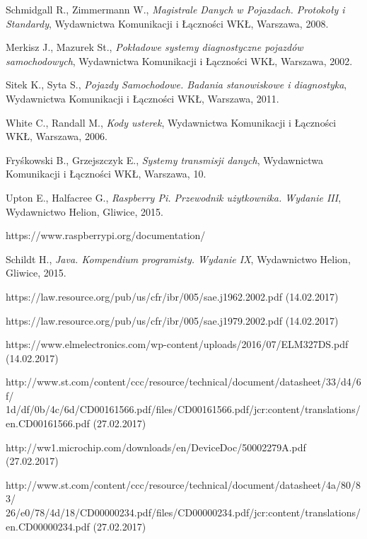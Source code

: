 \documentclass[12pt]{article} %
\numberwithin{equation}{subsection}
\numberwithin{figure}{section}
\numberwithin{table}{section}
\begin{document}
\begin{thebibliography}{99}

		Schmidgall R., Zimmermann W., \emph{Magistrale Danych w Pojazdach. Protokoły i Standardy}, Wydawnictwa Komunikacji i Łączności WKŁ, Warszawa, 2008.

		Merkisz J., Mazurek St., \emph{Pokładowe systemy diagnostyczne pojazdów samochodowych}, Wydawnictwa Komunikacji i Łączności WKŁ, Warszawa, 2002.		
		
		Sitek K., Syta S., \emph{Pojazdy Samochodowe. Badania stanowiskowe i diagnostyka}, Wydawnictwa Komunikacji i Łączności WKŁ, Warszawa, 2011.
		
		White C., Randall M., \emph{Kody usterek}, Wydawnictwa Komunikacji i Łączności WKŁ, Warszawa, 2006.
		
		Fryśkowski B., Grzejszczyk E., \emph{Systemy transmisji danych}, Wydawnictwa Komunikacji i Łączności WKŁ, Warszawa, 10.
		
		Upton E., Halfacree G., \emph{Raspberry Pi. Przewodnik użytkownika. Wydanie III}, Wydawnictwo Helion, Gliwice, 2015.
		
		https://www.raspberrypi.org/documentation/
	
		Schildt H., \emph{Java. Kompendium programisty. Wydanie IX}, Wydawnictwo Helion, Gliwice, 2015.
		
		https://law.resource.org/pub/us/cfr/ibr/005/sae.j1962.2002.pdf (14.02.2017)
		
		https://law.resource.org/pub/us/cfr/ibr/005/sae.j1979.2002.pdf (14.02.2017)
		
		https://www.elmelectronics.com/wp-content/uploads/2016/07/ELM327DS.pdf (14.02.2017)
		
		http://www.st.com/content/ccc/resource/technical/document/datasheet/33/d4/6f/
		1d/df/0b/4c/6d/CD00161566.pdf/files/CD00161566.pdf/jcr:content/translations/
		en.CD00161566.pdf (27.02.2017)
		
		http://ww1.microchip.com/downloads/en/DeviceDoc/50002279A.pdf (27.02.2017)
		
		http://www.st.com/content/ccc/resource/technical/document/datasheet/4a/80/83/
		26/e0/78/4d/18/CD00000234.pdf/files/CD00000234.pdf/jcr:content/translations/
		en.CD00000234.pdf (27.02.2017)
		

\end{thebibliography}
\end{document}
